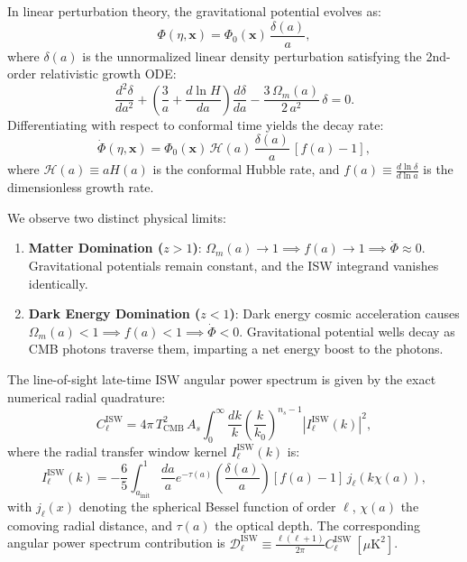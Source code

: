 \documentclass[11pt,a4paper]{article}
\theoremstyle{definition}
\begin{document}
In linear perturbation theory, the gravitational potential evolves as:
\begin{equation}
\Phi(\eta, \mathbf{x}) = \Phi_0(\mathbf{x})\,\frac{\delta(a)}{a},
\end{equation}
where $\delta(a)$ is the unnormalized linear density perturbation satisfying the 2nd-order relativistic growth ODE:
\begin{equation}
\frac{d^2 \delta}{da^2} + \left( \frac{3}{a} + \frac{d\ln H}{da} \right) \frac{d\delta}{da} - \frac{3\,\Omega_m(a)}{2\,a^2}\,\delta = 0.
\end{equation}
Differentiating with respect to conformal time yields the decay rate:
\begin{equation}
\dot{\Phi}(\eta, \mathbf{x}) = \Phi_0(\mathbf{x})\,\mathcal{H}(a)\,\frac{\delta(a)}{a}\,[f(a) - 1],
\end{equation}
where $\mathcal{H}(a) \equiv a H(a)$ is the conformal Hubble rate, and $f(a) \equiv \frac{d\ln \delta}{d\ln a}$ is the dimensionless growth rate.

We observe two distinct physical limits:
\begin{enumerate}
    \item \textbf{Matter Domination ($z > 1$)}: $\Omega_m(a) \to 1 \implies f(a) \to 1 \implies \dot{\Phi} \approx 0$. Gravitational potentials remain constant, and the ISW integrand vanishes identically.
    \item \textbf{Dark Energy Domination ($z < 1$)}: Dark energy cosmic acceleration causes $\Omega_m(a) < 1 \implies f(a) < 1 \implies \dot{\Phi} < 0$. Gravitational potential wells decay as CMB photons traverse them, imparting a net energy boost to the photons.
\end{enumerate}

The line-of-sight late-time ISW angular power spectrum is given by the exact numerical radial quadrature:
\begin{equation}
C_\ell^{\mathrm{ISW}} = 4\pi\,T_{\mathrm{CMB}}^2\,A_s \int_0^\infty \frac{dk}{k} \left( \frac{k}{k_0} \right)^{n_s - 1} |I_\ell^{\mathrm{ISW}}(k)|^2,
\end{equation}
where the radial transfer window kernel $I_\ell^{\mathrm{ISW}}(k)$ is:
\begin{equation}
I_\ell^{\mathrm{ISW}}(k) = -\frac{6}{5} \int_{a_{\mathrm{init}}}^1 \frac{da}{a} e^{-\tau(a)} \left(\frac{\delta(a)}{a}\right) [f(a) - 1]\,j_\ell(k\chi(a)),
\end{equation}
with $j_\ell(x)$ denoting the spherical Bessel function of order $\ell$, $\chi(a)$ the comoving radial distance, and $\tau(a)$ the optical depth. The corresponding angular power spectrum contribution is $\mathcal{D}_\ell^{\mathrm{ISW}} \equiv \frac{\ell(\ell+1)}{2\pi} C_\ell^{\mathrm{ISW}}\ [\mu\mathrm{K}^2]$.
\end{document}
